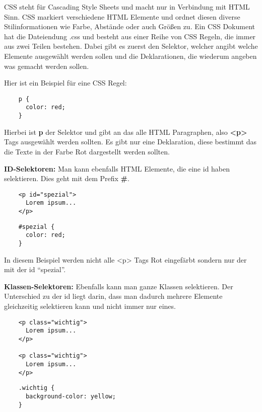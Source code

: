 CSS steht für Cascading Style Sheets und macht nur in Verbindung mit HTML Sinn. CSS markiert verschiedene HTML Elemente und ordnet diesen diverse Stilinformationen wie Farbe, Abstände oder auch Größen zu. Ein CSS Dokument hat die Dateiendung .css und besteht aus einer Reihe von CSS Regeln, die immer aus zwei Teilen bestehen. Dabei gibt es zuerst den Selektor, welcher angibt welche Elemente ausgewählt werden sollen und die Deklarationen, die wiederum angeben was gemacht werden sollen.

Hier ist ein Beispiel für eine CSS Regel:

\begin{lstlisting}
    p {
      color: red;
    }
\end{lstlisting}

Hierbei ist \textbf{p} der Selektor und gibt an das alle HTML Paragraphen, also \textbf{<p>} Tags ausgewählt werden sollten. Es gibt nur eine Deklaration, diese bestimmt das die Texte in der Farbe Rot dargestellt werden sollten.

\textbf{ID-Selektoren:}
\newline
Man kann ebenfalls HTML Elemente, die eine id haben selektieren. Dies geht mit dem Prefix \textbf{\#}.

\begin{lstlisting}
    <p id="spezial">
      Lorem ipsum...
    </p>
\end{lstlisting}

\begin{lstlisting}
    #spezial {
      color: red;
    }
\end{lstlisting}

In diesem Beispiel werden nicht alle <p> Tags Rot eingefärbt sondern nur der mit der id “spezial”.

\textbf{Klassen-Selektoren:}
\newline
Ebenfalls kann man ganze Klassen selektieren. Der Unterschied zu der id liegt darin, dass man dadurch mehrere Elemente gleichzeitig selektieren kann und nicht immer nur eines.

\begin{lstlisting}
    <p class="wichtig">
      Lorem ipsum...
    </p>
    
    <p class="wichtig">
      Lorem ipsum...
    </p>
\end{lstlisting}

\begin{lstlisting}
    .wichtig {
      background-color: yellow;
    }
\end{lstlisting}

